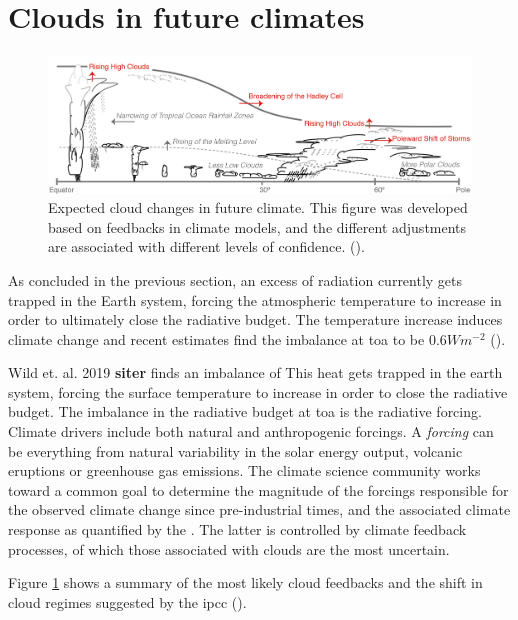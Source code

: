 \section{Clouds in future climates} \label{sec:intro_cloud_future_climates}
\begin{figure}[h]
    \centering
    \includegraphics[scale = 0.8]{Chapter1_Intro/images/Fig7-11_ipcc.jpg}
    \caption{Expected cloud changes in future climate. This figure was developed based on feedbacks in climate models, and the different adjustments are associated with different levels of confidence.  (\cite{IPCC_CH7_clouds}).}
    \label{fig:cloud_scheme}
\end{figure}
As concluded in the previous section, an excess of radiation currently gets trapped in the Earth system, forcing the atmospheric temperature to increase in order to ultimately close the radiative budget. The temperature increase induces climate change and recent estimates find the imbalance at \acrshort{toa} to be $0.6 Wm^{-2}$ (\cite{Wild2019TheModels}).

Wild et. al. 2019  \textbf{siter} finds an imbalance of This heat gets trapped in the earth system, forcing the surface temperature to increase in order to close the radiative budget. 
The imbalance in the radiative budget at \acrfull{toa} is the radiative forcing. 
Climate drivers include both natural and anthropogenic forcings. A \textit{forcing} can be everything from natural variability in the solar energy output, volcanic eruptions or greenhouse gas emissions. The climate science community works toward a common goal to determine the magnitude of the forcings responsible for the observed climate change since pre-industrial times, and the associated climate response as quantified by the . The latter is controlled by climate feedback processes, of which those associated with clouds are the most uncertain. %

Figure \ref{fig:cloud_scheme} shows a summary of the most likely cloud feedbacks and the shift in cloud regimes suggested by the \acrshort{ipcc} (\cite{IPCC_CH7_clouds}).

